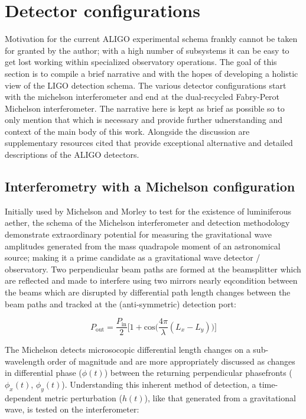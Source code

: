 \section{Detector configurations}
Motivation for the current ALIGO experimental schema frankly cannot be taken for granted by the author; with a high number of subsystems it can be easy to get lost working within specialized observatory operations. The goal of this section is to compile a brief narrative and with the hopes of developing a holistic view of the LIGO detection schema. The various detector configurations start with the michelson interferometer and end at the dual-recycled Fabry-Perot Michelson interferometer. The narrative here is kept as brief as possible so to only mention that which is necessary and provide further udnerstanding and context of the main body of this work. Alongside the discussion are supplementary resources cited that provide exceptional alternative and detailed descriptions of the ALIGO detectors. 

\subsection{Interferometry with a Michelson configuration}
Initially used by Michelson and Morley to test for the existence of luminiferous aether, the schema of the Michelson interferometer and detection methodology demonstrate extraordinary potential for measuring the gravitational wave amplitudes generated from the mass quadrapole moment of an astronomical source; making it a prime candidate as a gravitational wave detector / observatory. Two perpendicular beam paths are formed at the beamsplitter which are reflected and made to interfere using two mirrors nearly eqcondition between the beams which are disrupted by differential path length changes between the beam paths and tracked at the (anti-symmetric) detection port:

\begin{equation}\label{P_MICH}
	P_\mathrm{out} = \frac{P_\mathrm{in}}{2} \bigg[1+\mathrm{cos}\Big(\frac{4\pi}{\lambda} (L_x - L_y)\Big) \bigg]
\end{equation}

The Michelson detects microsocopic differential length changes on a sub-wavelength order of magnitude and are more appropriately discussed as changes in differential phase ($\phi(t)$) between the returning perpendicular phasefronts ($\phi_x(t)$, $\phi_y(t)$). Understanding this inherent method of detection, a time-dependent metric perturbation ($h(t)$), like that generated from a gravitational wave, is tested on the interferometer:

